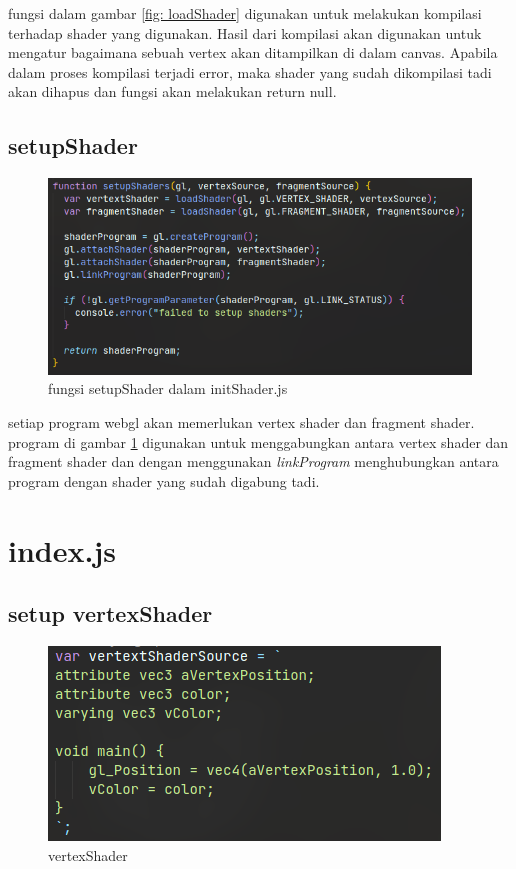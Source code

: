 fungsi dalam gambar \ref{fig: loadShader} digunakan untuk melakukan
kompilasi terhadap shader yang digunakan. Hasil dari kompilasi akan
digunakan untuk mengatur bagaimana sebuah vertex akan ditampilkan
di dalam canvas. Apabila dalam proses kompilasi terjadi error, maka
shader yang sudah dikompilasi tadi akan dihapus dan fungsi akan melakukan
return null.

\subsection{setupShader}

\begin{figure}[h]
    \includegraphics[width=\textwidth]{grafika/setupShader.png}
    \caption{fungsi setupShader dalam initShader.js}
    \label{fig: setupShader}
\end{figure}

setiap program webgl akan memerlukan vertex shader dan fragment shader.
program di gambar \ref{fig: setupShader} digunakan untuk menggabungkan
antara vertex shader dan fragment shader dan dengan menggunakan \emph{linkProgram} menghubungkan antara program
dengan shader yang sudah digabung tadi.



\section{index.js}

\subsection{setup vertexShader}

\begin{figure}[h]
    \centering
    \includegraphics{grafika/vertexShader.png}
    \caption{vertexShader}
    \label{fig: vertexShader}
\end{figure}

